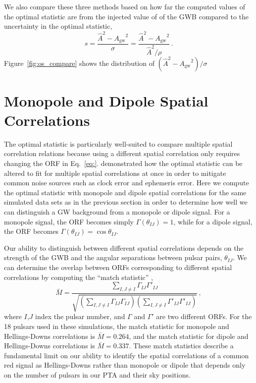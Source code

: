 \documentclass[twocolumn,aps,prd,superscriptaddress]{revtex4-1}
\newcommand{\Agw}{\ensuremath{A_\mathrm{gw}}}
\begin{document}
We also compare these three methods 
based on how far the computed values of the optimal statistic are from the injected value of of the GWB 
compared to the uncertainty in the optimal statistic,
\begin{equation}
	s = \frac{\hat{A}^2 - \Agw^2}{\sigma} = \frac{\hat{A}^2 - \Agw^2}{\hat{A}^2/\rho} \,.
\end{equation}
Figure~\ref{fig:os_compare} shows the distribution of $(\hat{A}^2-\Agw^2)/\sigma$


\section{Monopole and Dipole Spatial Correlations}
\label{sec:spatial}

The optimal statistic is particularly well-suited to compare multiple spatial correlation relations 
because using a different spatial correlation only requires changing the ORF 
in Eq.~\eqref{eq:}. 
\citet{thk+2016} demonstrated how the optimal statistic can be altered to fit for 
multiple spatial correlations at once in order to mitigate common noise sources such as 
clock error and ephemeris error. 
Here we compute the optimal statistic with monopole and dipole spatial correlations 
for the same simulated data sets as in the previous section in order to determine 
how well we can distinguish a GW background from a monopole or dipole signal. 
For a monopole signal, the ORF becomes simply
$\Gamma(\theta_{IJ}) = 1$, 
while for a dipole signal, the ORF becomes
$\Gamma(\theta_{IJ}) = \cos\theta_{IJ}$.

Our ability to distinguish between different spatial correlations 
depends on the strength of the GWB 
and the angular separations between pulsar pairs, $\theta_{IJ}$. 
We can determine the overlap between ORFs corresponding to different spatial correlations 
by computing the ``match statistic'' \citep{cs2016},
\begin{equation}
	\bar{M} = \frac{\sum_{I,J \neq I} \Gamma_{IJ} \Gamma'_{IJ}}{\sqrt{ \left( \sum_{I, J \neq I} \Gamma_{IJ} \Gamma_{IJ} \right) \left( \sum_{I, J \neq I} \Gamma'_{IJ} \Gamma'_{IJ} \right)}} \,,
\end{equation}
where $I$,$J$ index the pulsar number, and $\Gamma$ and $\Gamma'$ are two different ORFs. 
For the 18 pulsars used in these simulations, the 
match statistic for monopole and Hellings-Downs correlations is $\bar{M} = 0.264$, 
and the match statistic for dipole and Hellings-Downs correlations is $\bar{M} = 0.337$. 
These match statistics describe a fundamental limit on our ability 
to identify the spatial correlations of a common red signal as Hellings-Downs 
rather than monopole or dipole 
that depends only on the number of pulsars in our PTA and their sky positions.
\end{document}
